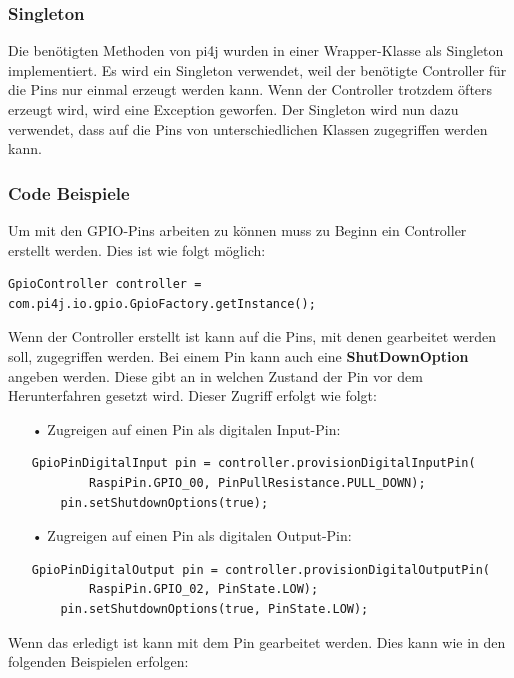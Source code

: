 \subsubsection{Singleton}
Die benötigten Methoden von pi4j wurden in einer Wrapper-Klasse als Singleton implementiert. Es wird ein Singleton verwendet, weil der benötigte Controller für die Pins nur einmal erzeugt werden kann. Wenn der Controller trotzdem öfters erzeugt wird, wird  eine Exception geworfen. Der Singleton wird nun dazu verwendet, dass auf die Pins von unterschiedlichen Klassen zugegriffen werden kann.

\subsubsection{Code Beispiele}
Um mit den GPIO-Pins arbeiten zu können muss zu Beginn ein Controller erstellt werden. Dies ist wie folgt möglich:
\begin{lstlisting}[style=JavaStyle, caption=GPIO-Controller erstellen]
	GpioController controller = com.pi4j.io.gpio.GpioFactory.getInstance();
\end{lstlisting}
Wenn der Controller erstellt ist kann auf die Pins, mit denen gearbeitet werden soll, zugegriffen werden. Bei einem Pin kann auch eine \textbf{ShutDownOption} angeben werden. Diese gibt an in welchen Zustand der Pin vor dem Herunterfahren gesetzt wird. Dieser Zugriff erfolgt wie folgt: 
\begin{itemize}
\item[•] Zugreigen auf einen Pin als digitalen Input-Pin:
\begin{lstlisting}[style=JavaStyle, caption=Zugriff auf einen Pin als Inpput]
	GpioPinDigitalInput pin = controller.provisionDigitalInputPin(
		RaspiPin.GPIO_00, PinPullResistance.PULL_DOWN);
	pin.setShutdownOptions(true);
\end{lstlisting}
\item[•] Zugreigen auf einen Pin als digitalen Output-Pin:
\begin{lstlisting}[style=JavaStyle, caption=Zugriff auf einen Pin als Output]
	GpioPinDigitalOutput pin = controller.provisionDigitalOutputPin(
		RaspiPin.GPIO_02, PinState.LOW);
	pin.setShutdownOptions(true, PinState.LOW);
\end{lstlisting}
\end{itemize}
Wenn das erledigt ist kann mit dem Pin gearbeitet werden. Dies kann wie in den folgenden Beispielen erfolgen:
